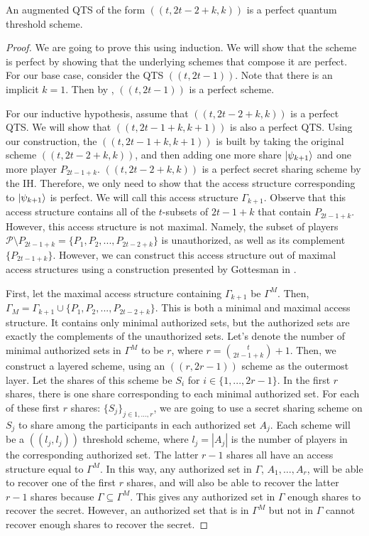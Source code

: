 \begin{theorem}
    An augmented QTS of the form $((t,2t-2+k,k))$ is a perfect quantum threshold scheme.
\end{theorem}

\begin{proof}
    We are going to prove this using induction. We will show that the scheme is perfect by showing that the underlying schemes that compose it are perfect. For our base case, consider the QTS $((t,2t-1))$. Note that there is an implicit $k=1$. Then by , $((t,2t-1))$ is a perfect scheme.
    
    For our inductive hypothesis, assume that $((t,2t-2+k,k))$ is a perfect QTS. We will show that $((t,2t-1+k,k+1))$ is also a perfect QTS. Using our construction, the $((t,2t-1+k,k+1))$ is built by taking the original scheme $((t,2t-2+k,k))$, and then adding one more share $\ket{\psi_{k+1}}$ and one more player $P_{2t-1+k}$. $((t,2t-2+k,k))$ is a perfect secret sharing scheme by the IH. Therefore, we only need to show that the access structure corresponding to $\ket{\psi_{k+1}}$ is perfect. We will call this access structure $\Gamma_{k+1}$. Observe that this access structure contains all of the $t$-subsets of $2t-1+k$ that contain $P_{2t-1+k}$. However, this access structure is not maximal. Namely, the subset of players $\mathcal{P} \setminus P_{2t-1+k} = \{P_1,P_2,...,P_{2t-2+k}\}$ is unauthorized, as well as its complement $\{P_{2t-1+k}\}$. However, we can construct this access structure out of maximal access structures using a construction presented by Gottesman in \cite{gottesman_theory_2000}.
    
    First, let the maximal access structure containing $\Gamma_{k+1}$ be $\Gamma^M$. Then, $\Gamma_M = \Gamma_{k+1} \cup \{P_1,P_2,...,P_{2t-2+k}\}$. This is both a minimal and maximal access structure. It contains only minimal authorized sets, but the authorized sets are exactly the complements of the unauthorized sets. Let's denote the number of minimal authorized sets in $\Gamma^M$ to be $r$, where $r = \binom{t}{2t-1+k} + 1$. Then, we construct a layered scheme, using an $((r,2r-1))$ scheme as the outermost layer. Let the shares of this scheme be $S_i$ for $i \in \{1,...,2r-1\}$. In the first $r$ shares, there is one share corresponding to each minimal authorized set. For each of these first $r$ shares: $\{S_j\}_{j\in 1,...,r}$, we are going to use a secret sharing scheme on $S_j$ to share among the participants in each authorized set $A_j$. Each scheme will be a $((l_j,l_j))$ threshold scheme, where $l_j = |A_j|$ is the number of players in the corresponding authorized set. The latter $r-1$ shares all have an access structure equal to $\Gamma^M$. In this way, any authorized set in $\Gamma$, $A_1,\dots,A_r$, will be able to recover one of the first $r$ shares, and will also be able to recover the latter $r-1$ shares because $\Gamma \subseteq \Gamma^M$. This gives any authorized set in $\Gamma$ enough shares to recover the secret. However, an authorized set that is in $\Gamma^M$ but not in $\Gamma$ cannot recover enough shares to recover the secret. 
    

\end{proof}
